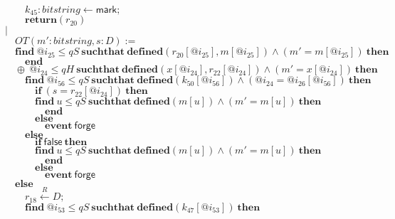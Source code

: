 \documentclass{article}
\newcommand{\store}{\leftarrow}
\newcommand{\getR}{\stackrel{R}{\store}}
\newcommand{\kw}[1]{\mathbf{#1}}
\newcommand{\kwf}[1]{\mathsf{#1}}
\newcommand{\var}[1]{\mathit{#1}}
\newcommand{\kwt}[1]{\mathit{#1}}
\newcommand{\kwp}[1]{\mathit{#1}}
\begin{document}
\begin{tabbing}
$\quad \quad \quad \var{k}_{45}: \kwt{bitstring} \store \kwf{mark};$\\
$\quad \quad \quad \kw{return}\kwf{}(\var{r}_{20})$\\
$\quad |$\\
$\quad \quad OT(\var{m'}: \kwt{bitstring}, \var{s}: \kwt{D}) :=$\\
$\quad \quad \kw{find}\ \var{@i}_{25} \leq \kwp{qS}\ \kw{suchthat}\ \kw{defined}(\var{r}_{20}[\var{@i}_{25}], \var{m}[\var{@i}_{25}])\wedge (\var{m'}  =  \var{m}[\var{@i}_{25}])\ \kw{then}$\\
$\quad \quad \quad \kw{end}$\\
$\quad \quad \oplus\ \var{@i}_{24} \leq \kwp{qH}\ \kw{suchthat}\ \kw{defined}(\var{x}[\var{@i}_{24}], \var{r}_{22}[\var{@i}_{24}])\wedge (\var{m'}  =  \var{x}[\var{@i}_{24}])\ \kw{then}$\\
$\quad \quad \quad \kw{find}\ \var{@i}_{56} \leq \kwp{qS}\ \kw{suchthat}\ \kw{defined}(\var{k}_{50}[\var{@i}_{56}])\wedge (\var{@i}_{24}  =  \var{@i}_{26}[\var{@i}_{56}])\ \kw{then}$\\
$\quad \quad \quad \quad \kw{if}\ (\var{s}  =  \var{r}_{22}[\var{@i}_{24}])\ \kw{then}$\\
$\quad \quad \quad \quad \kw{find}\ \var{u} \leq \kwp{qS}\ \kw{suchthat}\ \kw{defined}(\var{m}[\var{u}])\wedge (\var{m'}  =  \var{m}[\var{u}])\ \kw{then}$\\
$\quad \quad \quad \quad \quad \kw{end}$\\
$\quad \quad \quad \quad \kw{else}$\\
$\quad \quad \quad \quad \quad \kw{event}\ \kwf{forge}$\\
$\quad \quad \quad \kw{else}$\\
$\quad \quad \quad \quad \kw{if}\ \kwf{false}\ \kw{then}$\\
$\quad \quad \quad \quad \kw{find}\ \var{u} \leq \kwp{qS}\ \kw{suchthat}\ \kw{defined}(\var{m}[\var{u}])\wedge (\var{m'}  =  \var{m}[\var{u}])\ \kw{then}$\\
$\quad \quad \quad \quad \quad \kw{end}$\\
$\quad \quad \quad \quad \kw{else}$\\
$\quad \quad \quad \quad \quad \kw{event}\ \kwf{forge}$\\
$\quad \quad \kw{else}$\\
$\quad \quad \quad \var{r}_{18} \getR \kwt{D};$\\
$\quad \quad \quad \kw{find}\ \var{@i}_{53} \leq \kwp{qS}\ \kw{suchthat}\ \kw{defined}(\var{k}_{47}[\var{@i}_{53}])\ \kw{then}$\\

\end{tabbing}
\end{document}
